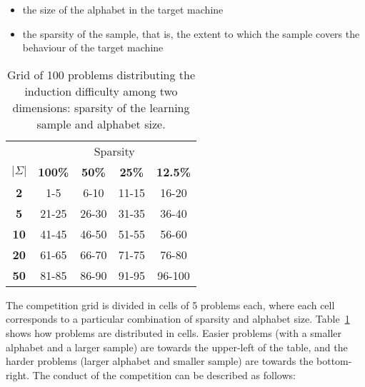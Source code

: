 \begin{itemize}
\item the size of the alphabet in the target machine
\item the sparsity of the sample, that is, the extent to which the sample covers the behaviour of the target machine
\end{itemize}

\begin{table}
\begin{center}
\begin{tabular}{c|c c c c}
&\multicolumn{4}{|c}{Sparsity}\\ 
\textbf{$|\Sigma|$} & \textbf{100\%} & \textbf{50\%} & \textbf{25\%} & \textbf{12.5\%}\\
\hline
\textbf{2}  & 1-5   & 6-10  & 11-15 & 16-20 \\
\textbf{5}  & 21-25 & 26-30 & 31-35 & 36-40 \\
\textbf{10} & 41-45 & 46-50 & 51-55 & 56-60 \\
\textbf{20} & 61-65 & 66-70 & 71-75 & 76-80 \\
\textbf{50} & 81-85 & 86-90 & 91-95 & 96-100\\
\end{tabular}
\end{center}
\caption{\label{stamina:table:problem-grid}Grid of 100 problems distributing the induction difficulty among two dimensions: sparsity of the learning sample and alphabet size.}
\end{table}

The competition grid is divided in cells of 5 problems each, where each cell corresponds to a particular combination of sparsity and alphabet size. Table~\ref{stamina:table:problem-grid} shows how problems are distributed in cells. Easier problems (with a smaller alphabet and a larger sample) are towards the upper-left of the table, and the harder problems (larger alphabet and smaller sample) are towards the bottom-right. The conduct of the competition can be described as follows:

